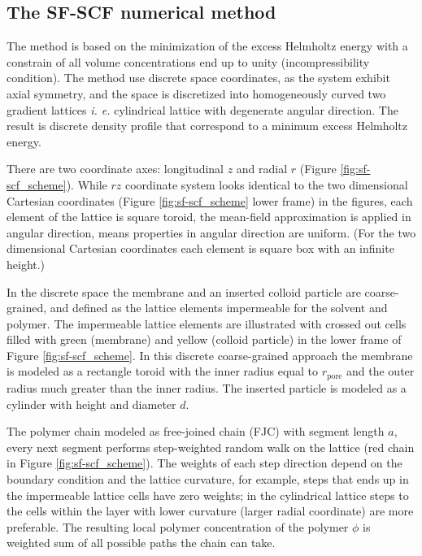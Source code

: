 \documentclass[10pt, a4paper]{article}
\begin{document}
\subsection*{The SF-SCF numerical method}
\begin{multicols}{2}


The method is based on the minimization of the excess Helmholtz energy with a constrain of all volume concentrations end up to unity (incompressibility condition).
The method use discrete space coordinates, as the system exhibit axial symmetry, and the space is discretized into homogeneously curved two gradient lattices \emph{i. e.} cylindrical lattice with degenerate angular direction.
The result is discrete density profile that correspond to a minimum excess Helmholtz energy.

There are two coordinate axes: longitudinal $z$ and radial $r$ (Figure \ref{fig:sf-scf_scheme}). 
While $rz$ coordinate system looks identical to the two dimensional Cartesian coordinates (Figure \ref{fig:sf-scf_scheme} lower frame) in the figures, each element of the lattice is square toroid, the mean-field approximation is applied in angular direction, means properties in angular direction are uniform.
(For the two dimensional Cartesian coordinates each element is square box with an infinite height.)

In the discrete space the membrane and an inserted colloid particle are coarse-grained, and defined as the lattice elements impermeable for the solvent and polymer.
The impermeable lattice elements are illustrated with crossed out cells filled with green (membrane) and yellow (colloid particle) in  the lower frame of Figure \ref{fig:sf-scf_scheme}.
In this discrete coarse-grained approach the membrane is modeled as a rectangle toroid with the inner radius equal to $r_{\textrm{pore}}$ and the outer radius much greater than the inner radius.
The inserted particle is modeled as a cylinder with height and diameter $d$.

The polymer chain modeled as free-joined chain (FJC) with segment length $a$, every next segment performs step-weighted random walk on the lattice (red chain in Figure \ref{fig:sf-scf_scheme}).
The weights of each step direction depend on the boundary condition and the lattice curvature, for example, steps that ends up in the impermeable lattice cells have zero weights; in the cylindrical lattice steps to the cells within the layer with lower curvature (larger radial coordinate) are more preferable.
The resulting local polymer concentration of the polymer $\phi$ is weighted sum of all possible paths the chain can take.



\end{multicols}
\end{document}
